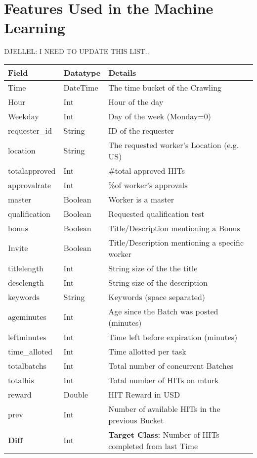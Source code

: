 \appendix

\section{Features Used in the Machine Learning}
DJELLEL: I NEED TO UPDATE THIS LIST..
\begin{table}[ht]
\begin{tabular}{|l|l|l|}
\hline
\textbf{Field} & \textbf{Datatype} & \textbf{Details}\\ \hline\hline
Time     &  DateTime & The time bucket of the Crawling\\ \hline
Hour      & Int    &  Hour of the day   \\ \hline
Weekday      & Int   &  Day of the week (Monday=0)  \\ \hline
requester\_id     & String &   ID of the requester       \\ \hline
location      & String &  The requested worker's Location (e.g. US)       \\ \hline
totalapproved    & Int &  \#total approved HITs      \\ \hline
approvalrate      & Int&   \%of worker's approvals       \\ \hline
master     &  Boolean    &  Worker is a master  \\ \hline
qualification    &Boolean  &   Requested qualification test       \\ \hline
bonus      &Boolean    &  Title/Description mentioning a Bonus    \\ \hline
Invite      & Boolean     &    Title/Description mentioning a specific worker\\ \hline
titlelength      & Int&   String size of the the title       \\ \hline
desclength    & Int &  String size of the description      \\ \hline
keywords      & String & Keywords (space separated)        \\ \hline
ageminutes      &  Int  &  Age since the Batch was posted (minutes)   \\ \hline
leftminutes      & Int  & Time left before expiration (minutes) \\ \hline
time\_alloted    & Int &  Time allotted per task   \\ \hline
totalbatchs      & Int  & Total number of concurrent Batches      \\ \hline
totalhis      & Int    &  Total number of HITs on mturk   \\ \hline
reward    & Double      & HIT Reward in USD  \\ \hline
prev      & Int     &  Number of available HITs in the previous Bucket  \\ \hline
\textbf{Diff}      & Int &   \textbf{Target Class}: Number of HITs completed from last Time \\ \hline
\end{tabular}
\end{table}